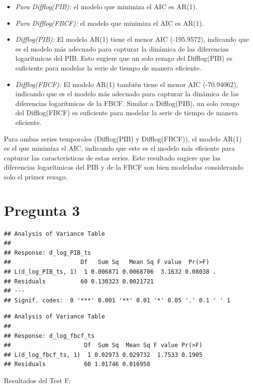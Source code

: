 \documentclass[
  12pt,
]{article}
\begin{document}
\begin{itemize}
\item
  \emph{Para Difflog(PIB):} el modelo que minimiza el AIC es AR(1).
\item
  \emph{Para Difflog(FBCF):} el modelo que minimiza el AIC es AR(1).
\item
  \emph{Difflog(PIB):} El modelo AR(1) tiene el menor AIC (-195.9572),
  indicando que es el modelo más adecuado para capturar la dinámica de
  las diferencias logarítmicas del PIB. Esto sugiere que un solo rezago
  del Difflog(PIB) es suficiente para modelar la serie de tiempo de
  manera eficiente.
\item
  \emph{Difflog(FBCF):} El modelo AR(1) también tiene el menor AIC
  (-70.94062), indicando que es el modelo más adecuado para capturar la
  dinámica de las diferencias logarítmicas de la FBCF. Similar a
  Difflog(PIB), un solo rezago del Difflog(FBCF) es suficiente para
  modelar la serie de tiempo de manera eficiente.
\end{itemize}

Para ambas series temporales (Difflog(PIB) y Difflog(FBCF)), el modelo
AR(1) es el que minimiza el AIC, indicando que este es el modelo más
eficiente para capturar las características de estas series. Este
resultado sugiere que las diferencias logarítmicas del PIB y de la FBCF
son bien modeladas considerando solo el primer rezago.

\section{Pregunta 3}\label{pregunta-3}

\begin{verbatim}
## Analysis of Variance Table
## 
## Response: d_log_PIB_ts
##                    Df   Sum Sq   Mean Sq F value  Pr(>F)  
## L(d_log_PIB_ts, 1)  1 0.006871 0.0068706  3.1632 0.08038 .
## Residuals          60 0.130323 0.0021721                  
## ---
## Signif. codes:  0 '***' 0.001 '**' 0.01 '*' 0.05 '.' 0.1 ' ' 1
\end{verbatim}

\begin{verbatim}
## Analysis of Variance Table
## 
## Response: d_log_fbcf_ts
##                     Df  Sum Sq  Mean Sq F value Pr(>F)
## L(d_log_fbcf_ts, 1)  1 0.02973 0.029732  1.7533 0.1905
## Residuals           60 1.01746 0.016958
\end{verbatim}

Resultados del Test F:
\end{document}
